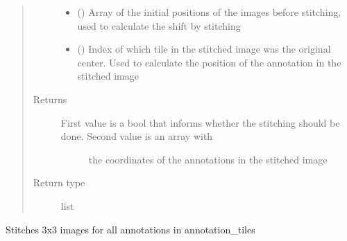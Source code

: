 \documentclass[letterpaper,10pt,english]{sphinxmanual}
\begin{document}
\begin{fulllineitems}
\begin{fulllineitems}
\begin{quote}
\begin{description}
\begin{itemize}
\item {} 
 () \textendash{} Array of the initial positions of the images before stitching, used to
calculate the shift by stitching

\item {} 
 () \textendash{} Index of which tile in the stitched image was the original center. Used to calculate
the position of the annotation in the stitched image

\end{itemize}

\item[{Returns}] \leavevmode
\begin{description}
\item[{First value is a bool that informs whether the stitching should be done. Second value is an array with}] \leavevmode
the coordinates of the annotations in the stitched image

\end{description}


\item[{Return type}] \leavevmode
list

\end{description}\end{quote}

\end{fulllineitems}


\begin{fulllineitems}
\label{\detokenize{index:stitch_MAPS_annotations.Stitcher.stitch_annotated_tiles}}
Stitches 3x3 images for all annotations in annotation\_tiles


\end{fulllineitems}
\end{fulllineitems}
\end{document}
